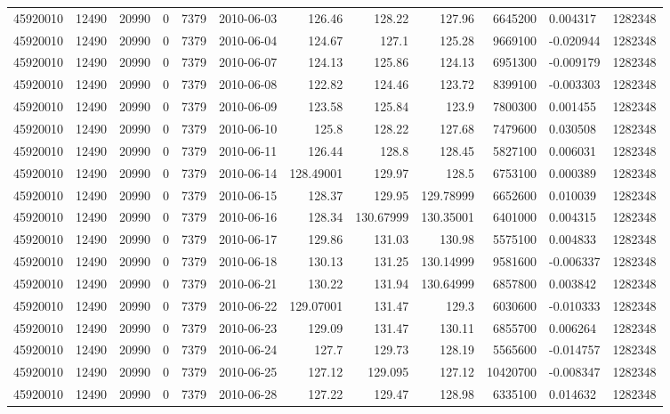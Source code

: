 \begin{tabular}{l | r | r | r | r | l | r | r | r | r | l | r}
45920010 & 12490 & 20990 & 0 & 7379 & 2010-06-03 & 126.46 & 128.22 & 127.96 & 6645200 & 0.004317 & 1282348 \\
45920010 & 12490 & 20990 & 0 & 7379 & 2010-06-04 & 124.67 & 127.1 & 125.28 & 9669100 & -0.020944 & 1282348 \\
45920010 & 12490 & 20990 & 0 & 7379 & 2010-06-07 & 124.13 & 125.86 & 124.13 & 6951300 & -0.009179 & 1282348 \\
45920010 & 12490 & 20990 & 0 & 7379 & 2010-06-08 & 122.82 & 124.46 & 123.72 & 8399100 & -0.003303 & 1282348 \\
45920010 & 12490 & 20990 & 0 & 7379 & 2010-06-09 & 123.58 & 125.84 & 123.9 & 7800300 & 0.001455 & 1282348 \\
45920010 & 12490 & 20990 & 0 & 7379 & 2010-06-10 & 125.8 & 128.22 & 127.68 & 7479600 & 0.030508 & 1282348 \\
45920010 & 12490 & 20990 & 0 & 7379 & 2010-06-11 & 126.44 & 128.8 & 128.45 & 5827100 & 0.006031 & 1282348 \\
45920010 & 12490 & 20990 & 0 & 7379 & 2010-06-14 & 128.49001 & 129.97 & 128.5 & 6753100 & 0.000389 & 1282348 \\
45920010 & 12490 & 20990 & 0 & 7379 & 2010-06-15 & 128.37 & 129.95 & 129.78999 & 6652600 & 0.010039 & 1282348 \\
45920010 & 12490 & 20990 & 0 & 7379 & 2010-06-16 & 128.34 & 130.67999 & 130.35001 & 6401000 & 0.004315 & 1282348 \\
45920010 & 12490 & 20990 & 0 & 7379 & 2010-06-17 & 129.86 & 131.03 & 130.98 & 5575100 & 0.004833 & 1282348 \\
45920010 & 12490 & 20990 & 0 & 7379 & 2010-06-18 & 130.13 & 131.25 & 130.14999 & 9581600 & -0.006337 & 1282348 \\
45920010 & 12490 & 20990 & 0 & 7379 & 2010-06-21 & 130.22 & 131.94 & 130.64999 & 6857800 & 0.003842 & 1282348 \\
45920010 & 12490 & 20990 & 0 & 7379 & 2010-06-22 & 129.07001 & 131.47 & 129.3 & 6030600 & -0.010333 & 1282348 \\
45920010 & 12490 & 20990 & 0 & 7379 & 2010-06-23 & 129.09 & 131.47 & 130.11 & 6855700 & 0.006264 & 1282348 \\
45920010 & 12490 & 20990 & 0 & 7379 & 2010-06-24 & 127.7 & 129.73 & 128.19 & 5565600 & -0.014757 & 1282348 \\
45920010 & 12490 & 20990 & 0 & 7379 & 2010-06-25 & 127.12 & 129.095 & 127.12 & 10420700 & -0.008347 & 1282348 \\
45920010 & 12490 & 20990 & 0 & 7379 & 2010-06-28 & 127.22 & 129.47 & 128.98 & 6335100 & 0.014632 & 1282348 \\

\end{tabular}
